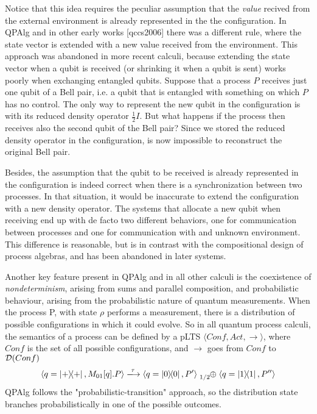 Notice that this idea requires the peculiar assumption that the \textit{value} recived from the external environment is already represented in the the configuration. In QPAlg and in other early works [qccs2006] there was a different rule, where the state vector is extended with a new value received from the environment. This approach was abandoned in more recent calculi, because extending the state vector when a qubit is received (or shrinking it when a qubit is sent) works poorly when exchanging entangled qubits. 
Suppose that a process $P$ receives just one qubit of a Bell pair, i.e. a qubit that is entangled with something on which $P$ has no control. The only way to represent the new qubit in the configuration is with its reduced density operator $\frac{1}{2}I$. But what happens if the process then receives also the second qubit of the Bell pair? Since we stored the reduced density operator in the configuration, is now impossible to reconstruct the original Bell pair.

Besides, the assumption that the qubit to be received is already represented in the configuration is indeed correct when there is a synchronization between two processes. In that situation, it would be inaccurate to extend the configuration with a new density operator. The systems that allocate a new qubit when receiving end up with de facto two different behaviors, one for communication between processes and one for communication with and unknown environment. This difference is reasonable, but is in contrast with the compositional design of process algebras, and has been abandoned in later systems.


Another key feature present in QPAlg and in all other calculi is the coexistence of \textit{nondeterminism}, arising from sums and parallel composition, and probabilistic behaviour, arising from the probabilistic nature of quantum measurements. When the process P, with state $\rho$ performs a measurement, there is a distribution of possible configurations in which it could evolve. So in all quantum process calculi, the semantics of a process can be defined by a pLTS $\langle Conf, Act, \rightarrow \rangle$, where $Conf$ is the set of all possible configurations, and $\rightarrow$ goes from $Conf$ to $\mathcal{D}(Conf)$
\[
	\confw{q = \proj{+}, M_{01}[q].P} 
	\xlongrightarrow{\tau} 
	\confw{q = \proj{0}, P'} \psum{1/2} \confw{q = \proj{1}, P''}
\]
QPAlg follows the "probabilistic-transition" approach, so the distribution state branches probabilistically in one of the possible outcomes.



